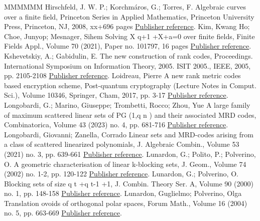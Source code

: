 \documentclass[11pt]{article}
\theoremstyle{definition}
\numberwithin{equation}{section}
\begin{document}
\begin{thebibliography}{MMMMMM}
 Hirschfeld, J. W. P.; Korchmáros, G.; Torres, F. Algebraic curves over a finite field, Princeton Series in Applied Mathematics, Princeton University Press, Princeton, NJ, 2008, xx+696 pages \href{https://alco.centre-mersenne.org/articles/10.5802/alco.377/#HKT}{Publisher reference}.
 Kim, Kwang Ho; Choe, Junyop; Mesnager, Sihem Solving X q+1 +X+a=0 over finite fields, Finite Fields Appl., Volume 70 (2021), Paper no. 101797, 16 pages \href{https://alco.centre-mersenne.org/articles/10.5802/alco.377/#kim2021solving}{Publisher reference}.
 Kshevetskiy, A.; Gabidulin, E. The new construction of rank codes, Proceedings. International Symposium on Information Theory, 2005. ISIT 2005., IEEE, 2005, pp. 2105-2108 \href{https://alco.centre-mersenne.org/articles/10.5802/alco.377/#kshevetskiy2005new}{Publisher reference}.
 Loidreau, Pierre A new rank metric codes based encryption scheme, Post-quantum cryptography (Lecture Notes in Comput. Sci.), Volume 10346, Springer, Cham, 2017, pp. 3-17 \href{https://alco.centre-mersenne.org/articles/10.5802/alco.377/#MR3678916}{Publisher reference}.
 Longobardi, G.; Marino, Giuseppe; Trombetti, Rocco; Zhou, Yue A large family of maximum scattered linear sets of  PG (1,q n ) and their associated MRD codes, Combinatorica, Volume 43 (2023) no. 4, pp. 681-716 \href{https://alco.centre-mersenne.org/articles/10.5802/alco.377/#longobardi2023large}{Publisher reference}.
 Longobardi, Giovanni; Zanella, Corrado Linear sets and MRD-codes arising from a class of scattered linearized polynomials, J. Algebraic Combin., Volume 53 (2021) no. 3, pp. 639-661 \href{https://alco.centre-mersenne.org/articles/10.5802/alco.377/#longobardi2021linear}{Publisher reference}.
 Lunardon, G.; Polito, P.; Polverino, O. A geometric characterisation of linear k-blocking sets, J. Geom., Volume 74 (2002) no. 1-2, pp. 120-122 \href{https://alco.centre-mersenne.org/articles/10.5802/alco.377/#lunardon2002geometric}{Publisher reference}.
 Lunardon, G.; Polverino, O. Blocking sets of size q t +q t-1 +1, J. Combin. Theory Ser. A, Volume 90 (2000) no. 1, pp. 148-158 \href{https://alco.centre-mersenne.org/articles/10.5802/alco.377/#lunardon2000blocking}{Publisher reference}.
 Lunardon, Guglielmo; Polverino, Olga Translation ovoids of orthogonal polar spaces, Forum Math., Volume 16 (2004) no. 5, pp. 663-669 \href{https://alco.centre-mersenne.org/articles/10.5802/alco.377/#lunardon2004translation}{Publisher reference}.

\end{thebibliography}
\end{document}
